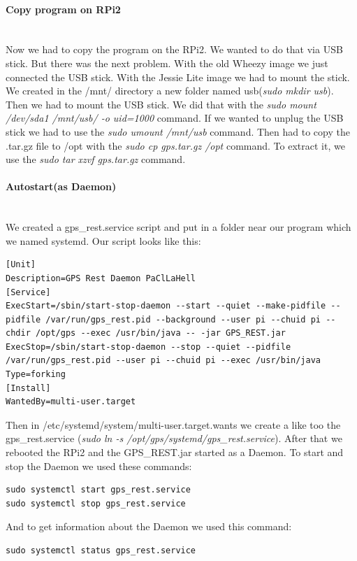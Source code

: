 \paragraph{Copy program on RPi2} \mbox{}\\
Now we had to copy the program on the RPi2. We wanted to do that via USB stick. But there was the next problem. With the old Wheezy image we just connected the USB stick. With the Jessie Lite image we had to mount the stick. We created in the /mnt/ directory a new folder named usb(\textit{sudo mkdir usb}). Then we had to mount the USB stick. We did that with the \textit{sudo mount /dev/sda1 /mnt/usb/ -o uid=1000} command. If we wanted to unplug the USB stick we had to use the \textit{sudo umount /mnt/usb} command.\newline
Then had to copy the .tar.gz file to /opt with the \textit{sudo cp gps.tar.gz /opt} command. To extract it, we use the \textit{sudo tar xzvf gps.tar.gz} command.\newline

\paragraph{Autostart(as Daemon)} \mbox{}\\
We created a gps\_rest.service script and put in a folder near our program which we named systemd. Our script looks like this:
\begin{verbatim}
[Unit]
Description=GPS Rest Daemon PaClLaHell
[Service]
ExecStart=/sbin/start-stop-daemon --start --quiet --make-pidfile --pidfile /var/run/gps_rest.pid --background --user pi --chuid pi --chdir /opt/gps --exec /usr/bin/java -- -jar GPS_REST.jar
ExecStop=/sbin/start-stop-daemon --stop --quiet --pidfile /var/run/gps_rest.pid --user pi --chuid pi --exec /usr/bin/java
Type=forking
[Install]
WantedBy=multi-user.target
\end{verbatim}
Then in /etc/systemd/system/multi-user.target.wants we create a like too the gps\_rest.service (\textit{sudo ln -s /opt/gps/systemd/gps\_rest.service}).
After that we rebooted the RPi2 and the GPS\_REST.jar started as a Daemon.
To start and stop the Daemon we used these commands:
\begin{verbatim}
sudo systemctl start gps_rest.service
sudo systemctl stop gps_rest.service
\end{verbatim}
And to get information about the Daemon we used this command:
\begin{verbatim}
sudo systemctl status gps_rest.service
\end{verbatim}


